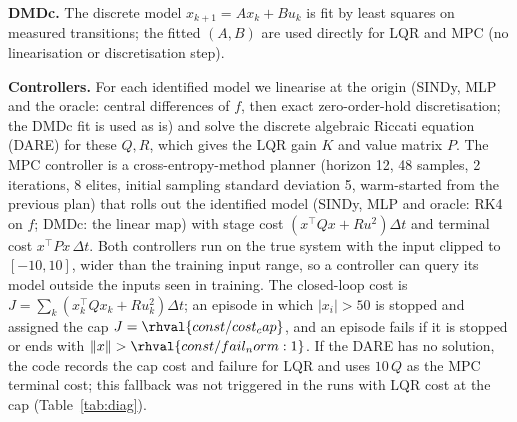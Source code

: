 \textbf{DMDc.} The discrete model $x_{k+1}=Ax_k+Bu_k$ is fit by least squares on measured transitions; the fitted $(A,B)$ are used directly for LQR and MPC (no linearisation or discretisation step).

\textbf{Controllers.} For each identified model we linearise at the origin (SINDy, MLP and the oracle: central differences of $f$, then exact zero-order-hold discretisation; the DMDc fit is used as is) and solve the discrete algebraic Riccati equation (DARE) for these $Q,R$, which gives the LQR gain $K$ and value matrix $P$. The MPC controller is a cross-entropy-method planner (horizon 12, 48 samples, 2 iterations, 8 elites, initial sampling standard deviation 5, warm-started from the previous plan) that rolls out the identified model (SINDy, MLP and oracle: RK4 on $f$; DMDc: the linear map) with stage cost $(x^\top Qx+Ru^2)\Delta t$ and terminal cost $x^\top Px\,\Delta t$. Both controllers run on the true system with the input clipped to $[-10,10]$, wider than the training input range, so a controller can query its model outside the inputs seen in training. The closed-loop cost is $J=\sum_k (x_k^\top Qx_k+Ru_k^2)\Delta t$; an episode in which $|x_i|>50$ is stopped and assigned the cap $J=\rhval{const/cost_cap}$, and an episode fails if it is stopped or ends with $\|x\|>\rhval{const/fail_norm:1}$. If the DARE has no solution, the code records the cap cost  and failure for LQR and uses $10\,Q$ as the MPC terminal cost; this fallback was not triggered in the runs with LQR cost at the cap (Table~\ref{tab:diag}).
